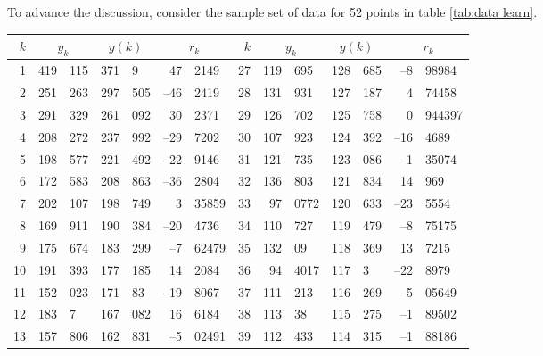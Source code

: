 To advance the discussion, consider the sample set of data for 52 points in table \ref{tab:data learn}.
\begin{table}[htbp]  %
    \begin{center}
        \begin{tabular}{r r@{.}l r@{.}l r@{.}l | r r@{.}l r@{.}l r@{.}l }
            $k$ & \multicolumn{2}{c}{$y_{k}$}
                & \multicolumn{2}{c}{$y(k)$}
                & \multicolumn{2}{c}{$r_{k}$} &
            $k$ & \multicolumn{2}{c}{$y_{k}$}
                & \multicolumn{2}{c}{$y(k)$}
                & \multicolumn{2}{c}{$r_{k}$} \\\hline
            1 &   419 & 115 &  371 &   9 &  47 & 2149 &  27 &  119 & 695 &  128 & 685 &  --8 & 98984 \\
            2 &   251 & 263 &  297 & 505 &  --46 & 2419 &  28 &  131 & 931 &  127 & 187 &  4 & 74458 \\
            3 &   291 & 329 &  261 & 092 &  30 & 2371 &  29 &  126 & 702 &  125 & 758 &  0 & 944397 \\
            4 &   208 & 272 &  237 & 992 &  --29 & 7202 &  30 &  107 & 923 &  124 & 392 &  --16 & 4689 \\
            5 &   198 & 577 &  221 & 492 &  --22 & 9146 &  31 &  121 & 735 &  123 & 086 &  --1 & 35074 \\
            6 &   172 & 583 &  208 & 863 &  --36 & 2804 &  32 &  136 & 803 &  121 & 834 &  14 & 969 \\
            7 &   202 & 107 &  198 & 749 &  3 & 35859 &  33 &  97 & 0772 &  120 & 633 &  --23 & 5554 \\
            8 &   169 & 911 &  190 & 384 &  --20 & 4736 &  34 &  110 & 727 &  119 & 479 &  --8 & 75175 \\
            9 &   175 & 674 &  183 & 299 &  --7 & 62479 &  35 &  132 & 09 &  118 & 369 &  13 & 7215 \\
            10 &  191 & 393 &  177 & 185 &  14 & 2084 &  36 &  94 & 4017 &  117 & 3 &  --22 & 8979 \\
            11 &  152 & 023 &  171 & 83  &  --19 & 8067 &  37 &  111 & 213 &  116 & 269 &  --5 & 05649 \\
            12 &  183 & 7   &  167 & 082 &  16 & 6184 &  38 &  113 & 38 &  115 & 275 &  --1 & 89502 \\
            13 &  157 & 806 &  162 & 831 &  --5 & 02491 &  39 &  112 & 433 &  114 & 315 &  --1 & 88186 \\

\end{tabular}
\end{center}
\end{table}
